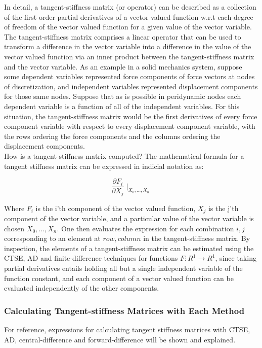 \documentclass[preprint,12pt]{elsarticle}
\begin{document}
In detail, a tangent-stiffness matrix (or operator) can be described as a collection of the first
order partial derivatives of a vector valued function w.r.t each degree of freedom of the vector
valued function for a given value of the vector variable.  The tangent-stiffness matrix comprises a
linear operator that can be used to transform a difference in the vector variable into a difference
in the value of the vector valued function via an inner product between the tangent-stiffness matrix
and the vector variable.  As an example in a solid mechanics system, suppose some dependent
variables represented force components of force vectors at nodes of discretization, and independent
variables represented displacement components for those same nodes. Suppose that as is possible in
peridynamic nodes each dependent variable is a function of all of the independent variables. For
this situation, the tangent-stiffness matrix would be the first derivatives of every force component
variable with respect to every displacement component variable, with the rows ordering the force
components and the columns ordering the displacement components.  \\

How is a tangent-stiffness matrix computed? The mathematical formula for a tangent stiffness matrix
can be expressed in indicial notation as: 

\begin{equation} \frac{\partial F_i}{\partial X_j}\mid_{X_0,...,X_n} \end{equation}

Where $F_i$ is the i'th component of the vector valued function, $X_j$ is the j'th component of the
vector variable, and a particular value of the vector variable is chosen $X_0,...,X_n$. One then
evaluates the expression for each combination $i, j$ corresponding to an element at $row, column$ in
the tangent-stiffness matrix. By inspection, the elements of a tangent-stiffness matrix can be
estimated using the CTSE, AD and finite-difference techniques for functions $F:R^1 \rightarrow R^1$,
since taking partial derivatives entails holding all but a single independent variable of the
function constant, and each component of a vector valued function can be evaluated independently of
the other components. \\

\subsubsection{Calculating Tangent-stiffness Matrices with Each Method}
For reference, expressions for calculating tangent stiffness matrices with CTSE, AD,
central-difference and forward-difference will be shown and explained.
\end{document}
